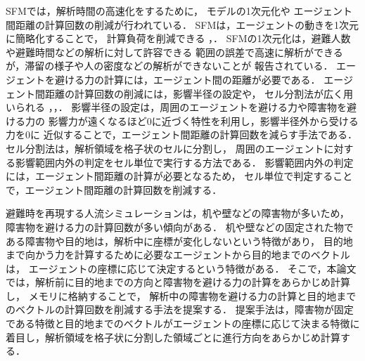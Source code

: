 SFMでは，解析時間の高速化をするために，
モデルの1次元化や
エージェント間距離の計算回数の削減が行われている．
%
SFMは，エージェントの動きを1次元に簡略化することで，
計算負荷を削減できる
\cite{1ji_sfm1}，\cite{1ji_sfm2}．
SFMの1次元化は，避難人数や避難時間などの解析に対して許容できる
範囲の誤差で高速に解析ができるが，滞留の様子や人の密度などの解析ができないことが
報告されている\cite{1ji_sfm1}．
%
エージェントを避ける力の計算には，エージェント間の距離が必要である．
エージェント間距離の計算回数の削減には，影響半径の設定や，
セル分割法が広く用いられる
\cite{seru_sfm1}，\cite{seru_sfm2}，\cite{katayose}．
影響半径の設定は，周囲のエージェントを避ける力や障害物を避ける力の
影響力が遠くなるほど0に近づく特性を利用し，影響半径外から受ける力を0に
近似することで，エージェント間距離の計算回数を減らす手法である．
セル分割法は，解析領域を格子状のセルに分割し，
周囲のエージェントに対する影響範囲内外の判定をセル単位で実行する方法である．
影響範囲内外の判定には，エージェント間距離の計算が必要となるため，
セル単位で判定することで，エージェント間距離の計算回数を削減する．

避難時を再現する人流シミュレーションは，机や壁などの障害物が多いため，
障害物を避ける力の計算回数が多い傾向がある．
机や壁などの固定された物である障害物や目的地は，解析中に座標が変化しないという特徴があり，
目的地まで向かう力を計算するために必要なエージェントから目的地までのベクトルは，
エージェントの座標に応じて決定するという特徴がある．
そこで，本論文では，解析前に目的地までの方向と障害物を避ける力の計算をあらかじめ計算し，
メモリに格納することで，
解析中の障害物を避ける力の計算と目的地までのベクトルの計算回数を削減する手法を提案する．
提案手法は，障害物が固定である特徴と目的地までのベクトルがエージェントの座標に応じて決まる特徴に
着目し，解析領域を格子状に分割した領域ごとに進行方向をあらかじめ計算する．





